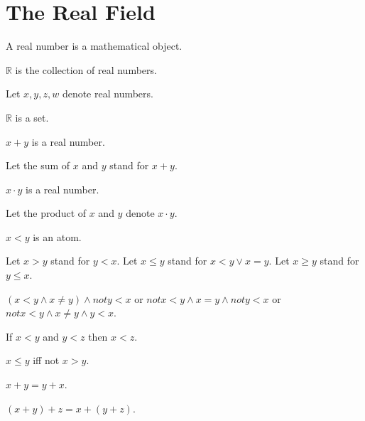 \documentclass{article}
\begin{document}
\section{The Real Field}

\begin{forthel}

\begin{signature}
A real number is a mathematical object.
\end{signature}

\begin{definition}
$\mathbb{R}$ is the collection of real numbers.
\end{definition}
Let $x,y,z,w$ denote real numbers.

\begin{axiom}
$\mathbb{R}$ is a set.
\end{axiom}


\begin{signature}[1 12 A1]
$x + y$ is a real number.
\end{signature}
Let the sum of $x$ and $y$ stand for $x + y$.

\begin{signature}[1 12 M1]
$x \cdot y$ is a real number.
\end{signature}
Let the product of $x$ and $y$ denote $x \cdot y$.

\begin{signature}[1 5]
$x < y$ is an atom.
\end{signature}
Let $x > y$ stand for $y < x$.
Let $x \leq y$ stand for $x < y \vee x = y$.
Let $x \geq y$ stand for $y \leq x$.

\begin{axiom}[1 5 i]
$(x < y \wedge x \neq y) \wedge not y < x$
or $not x < y \wedge x = y \wedge not y < x$
or $not x < y \wedge x \neq y \wedge y < x$.
\end{axiom}

\begin{axiom}[1 5 ii]
If $x < y$ and $y < z$ then $x < z$.
\end{axiom}

\begin{proposition}
$x \leq y$ iff not $x > y$.
\end{proposition}

\begin{axiom}[1 12 A2]
$x + y = y + x$.
\end{axiom}

\begin{axiom}[1 12 A3]
$(x + y) + z = x + (y + z)$.
\end{axiom}


\end{forthel}
\end{document}
